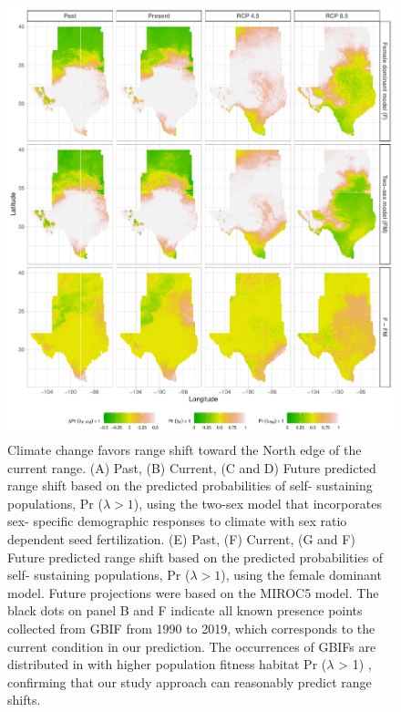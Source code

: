 \documentclass[12pt]{article}
\begin{document}
\begin{figure}[H]
  \begin{center}
    \includegraphics[width=0.95\linewidth]{Figures/Fig_geoPrlambda_miroc.pdf}
  \caption{Climate change favors range shift toward the North edge of the current range.
  (A) Past, (B) Current, (C and D) Future predicted range shift based on the predicted probabilities of self- sustaining populations, Pr ($\lambda > 1$), using the two-sex model that incorporates sex- specific demographic responses to climate with sex ratio dependent seed fertilization.
  (E) Past, (F) Current, (G and F) Future  predicted range shift based on the predicted probabilities of self- sustaining populations, Pr ($\lambda > 1$), using the female dominant model.
  Future projections were based on the MIROC5 model.
  The black dots on panel B and F indicate all known presence points collected from GBIF from 1990 to 2019, which corresponds to the current condition in our prediction. 
  The occurrences of GBIFs are distributed in with higher population fitness habitat Pr ($\lambda$ > 1) , confirming that our study approach can reasonably predict range shifts.}
  \label{Sup:geoprojmiroc}
  \end{center}
\end{figure}
\end{document}
